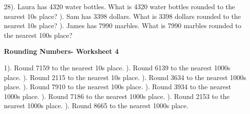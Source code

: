 \documentclass{article}%
\begin{document}
28). Laura has 4320 water bottles. What is 4320 water bottles rounded to the nearest 10s place?%
\newline%
\newline%
). Sam has 3398 dollars. What is 3398 dollars rounded to the nearest 10s place?%
\newline%
\newline%
). James has 7990 marbles. What is 7990 marbles rounded to the nearest 100s place?%
\newline%
\newline%
\newline%
\pagebreak%
\large%
\begin{center}%
\textbf{Rounding Numbers- Worksheet 4}%
\newline%
\end{center} \normalsize%
1). Round 7159 to the nearest 10s place.%
\newline%
\newline%
). Round 6139 to the nearest 1000s place.%
\newline%
\newline%
). Round 2115 to the nearest 10s place.%
\newline%
\newline%
). Round 3634 to the nearest 1000s place.%
\newline%
\newline%
). Round 7910 to the nearest 100s place.%
\newline%
\newline%
). Round 3934 to the nearest 1000s place.%
\newline%
\newline%
). Round 7186 to the nearest 1000s place.%
\newline%
\newline%
). Round 2153 to the nearest 1000s place.%
\newline%
\newline%
). Round 8665 to the nearest 1000s place.%
\newline%
\newline%
\end{document}
